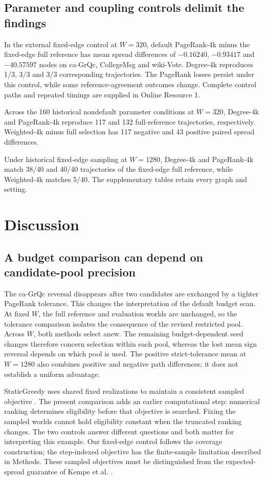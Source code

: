 \documentclass[smallextended]{svjour3}
\begin{document}
\subsection{Parameter and coupling controls delimit the findings}

In the external fixed-edge control at $W=320$, default PageRank-4k minus the fixed-edge full reference has mean spread differences of $-0.16240$, $-0.93417$ and $-40.57597$ nodes on ca-GrQc, CollegeMsg and wiki-Vote. Degree-4k reproduces 1/3, 3/3 and 3/3 corresponding trajectories. The PageRank losses persist under this control, while some reference-agreement outcomes change. Complete control paths and repeated timings are supplied in Online Resource 1.

Across the 160 historical nondefault parameter conditions at $W=320$, Degree-4k and PageRank-4k reproduce 117 and 132 full-reference trajectories, respectively. Weighted-4k minus full selection has 117 negative and 43 positive paired spread differences.

Under historical fixed-edge sampling at $W=1280$, Degree-4k and PageRank-4k match 38/40 and 40/40 trajectories of the fixed-edge full reference, while Weighted-4k matches 5/40. The supplementary tables retain every graph and setting.
\FloatBarrier

\section{Discussion}
\subsection{A budget comparison can depend on candidate-pool precision}
The ca-GrQc reversal disappears after two candidates are exchanged by a tighter PageRank tolerance. This changes the interpretation of the default budget scan. At fixed $W$, the full reference and evaluation worlds are unchanged, so the tolerance comparison isolates the consequence of the revised restricted pool. Across $W$, both methods select anew. The remaining budget-dependent seed changes therefore concern selection within each pool, whereas the lost mean sign reversal depends on which pool is used. The positive strict-tolerance mean at $W=1280$ also combines positive and negative path differences; it does not establish a uniform advantage.

StaticGreedy uses shared fixed realizations to maintain a consistent sampled objective \cite{ref8}. The present comparison adds an earlier computational step: numerical ranking determines eligibility before that objective is searched. Fixing the sampled worlds cannot hold eligibility constant when the truncated ranking changes. The two controls answer different questions and both matter for interpreting this example. Our fixed-edge control follows the coverage construction; the step-indexed objective has the finite-sample limitation described in Methods. These sampled objectives must be distinguished from the expected-spread guarantee of Kempe et al. \cite{ref1}.
\end{document}
